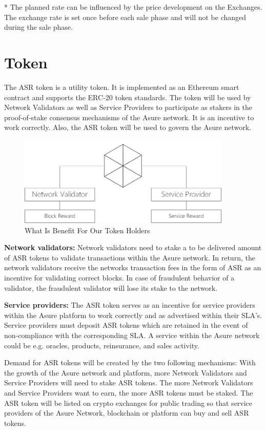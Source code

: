 * The planned rate can be influenced by the price development on the Exchanges. The exchange rate is set once before each sale phase and will not be changed during the sale phase.

\section{Token}

The ASR token is a utility token. It is implemented as an Ethereum smart contract and supports the ERC-20 token standards. The token will be used by Network Validators as well as Service Providers to participate as stakers in the proof-of-stake consensus mechanisms of the Asure network. It is an incentive to work correctly. Also, the ASR token will be used to govern the Asure network.

\begin{figure}[H]
    \centering
    \includegraphics[width=4.0in]{img/staking.png}
    \caption{What Is Benefit For Our Token Holders}
    \label{fig:asure_architecture}
\end{figure}

\textbf{Network validators:}
Network validators need to stake a to be delivered amount of ASR tokens to validate transactions within the Asure network. In return, the network validators receive the networks transaction fees in the form of ASR as an incentive for validating correct blocks. In case of fraudulent behavior of a validator, the fraudulent validator will lose its stake to the network.

\textbf{Service providers:}
The ASR token serves as an incentive for service providers within the Asure platform to work correctly and as advertised within their SLA’s. Service providers must deposit ASR tokens which are retained in the event of non-compliance with the corresponding SLA. A service within the Asure network could be e.g. oracles, products, reinsurance, and sales activity.\newline

Demand for ASR tokens will be created by the two following mechanisms: With the growth of the Asure network and platform, more Network Validators and Service Providers will need to stake ASR tokens. The more Network Validators and Service Providers want to earn, the more ASR tokens must be staked.\newline
The ASR token will be listed on crypto exchanges for public trading so that service providers of the Asure Network, blockchain or platform can buy and sell ASR tokens.\newline

